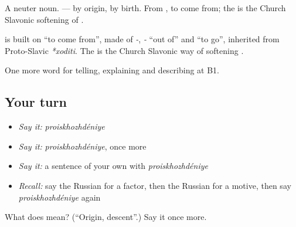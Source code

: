 A neuter noun. \emph{ } — by origin, by birth. From \emph{}, to come from; the \emph{} is the Church Slavonic softening of \emph{}.

\begin{cousinweb}
\textbf{} is built on \emph{} \textquotedblleft{}to come from\textquotedblright{}, made of \emph{-}, \emph{-} \textquotedblleft{}out of\textquotedblright{} and \emph{} \textquotedblleft{}to go\textquotedblright{}, inherited from Proto-Slavic \emph{*xoditi}. The \emph{} is the Church Slavonic way of softening \emph{}.
\end{cousinweb}

\begin{grammarlens}[title={What you've built}]
One more word for telling, explaining and describing at B1.
\end{grammarlens}

\subsection*{Your turn}
\begin{itemize}
\raggedright
  \item \emph{Say it:} \emph{proiskhozhdéniye}
  \item \emph{Say it:} \emph{proiskhozhdéniye}, once more
  \item \emph{Say it:} a sentence of your own with \emph{proiskhozhdéniye}
  \item \emph{Recall:} say the Russian for a factor, then the Russian for a motive, then say \emph{proiskhozhdéniye} again
\end{itemize}

\begin{tcolorbox}[breakable,colback=teal!4,colframe=teal!35!black,title={Before you move on}]
What does  mean? (\textquotedblleft{}Origin, descent\textquotedblright{}.) Say it once more.
\end{tcolorbox}
